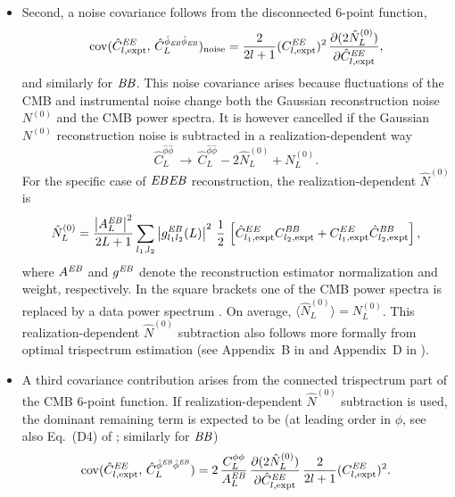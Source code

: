 \begin{itemize}
\item Second, a noise covariance follows from the disconnected 6-point function,
\begin{equation}
  \label{eq:2}
\mathrm{cov}(\hat C^{\mathit{EE}}_{l,\mathrm{expt}}, \,\hat C^{\hat\phi_{\mathit{EB}}\hat\phi_{\mathit{EB}}}_L)_\mathrm{noise}
=
\frac{2}{2l+1}(C^{\mathit{EE}}_{l,\mathrm{expt}})^2 \, \frac{\partial(2\hat N^{(0)}_L)}{\partial \hat C^{\mathit{EE}}_{l,\mathrm{expt}}},
\end{equation}
and similarly for $\mathit{BB}$.
This noise covariance arises because fluctuations of the CMB and instrumental noise change both the Gaussian reconstruction noise $N^{(0)}$ and the CMB power spectra.  It is however cancelled if the Gaussian $N^{(0)}$ reconstruction noise is subtracted in a realization-dependent way \cite{cora0812,duncan1008,Namikawa1209,marcel1308}
\begin{equation}
  \label{eq:RDN0procedure}
  \hat C^{\hat\phi\hat\phi}_L \,\rightarrow \,
\hat C^{\hat\phi\hat\phi}_L - 2 \hat N^{(0)}_L + N^{(0)}_{L}.
\end{equation}
For the specific case of $\mathit{EB}\mathit{EB}$ reconstruction, the realization-dependent $\hat N^{(0)}$ is 
\begin{equation}
  \label{eq:RDN0}
  \hat N^{(0)}_L = \frac{\left|A_L^{\mathit{EB}}\right|^2}{2L+1}\sum_{l_1,l_2} 
\left| g^{\mathit{EB}}_{l_1l_2}(L) \right|^2
\,\frac{1}{2}\,\left[\hat C^{EE}_{l_1,\mathrm{expt}} C^{\mathit{BB}}_{l_2,\mathrm{expt}}+ C^{EE}_{l_1,\mathrm{expt}} \hat C^{\mathit{BB}}_{l_2,\mathrm{expt}}\right],
\end{equation}
where $A^{\mathit{EB}}$ and $g^{\mathit{EB}}$ denote the reconstruction estimator normalization and weight, respectively. 
In the square brackets one of the CMB power spectra is replaced by a data power spectrum . On average,  $\langle \hat N^{(0)}_L \rangle = N^{(0)}_L$.  This realization-dependent $\hat N^{(0)}$ subtraction also follows more formally from optimal trispectrum estimation (see Appendix~B in \cite{marcel1308} and Appendix~D in \cite{Planck2013Lensing}).

\item A third covariance contribution  arises from the connected trispectrum part of the CMB 6-point function. If realization-dependent $\hat N^{(0)}$  subtraction is used, the dominant remaining term is expected to be (at leading order in $\phi$, see also Eq.~(D4) of \cite{marcel1308}; similarly for $\mathit{BB}$)
\begin{equation}
  \label{eq:cov_EBEB_EE}
      \mathrm{cov}(\hat C_{l,\mathrm{expt}}^{\mathit{EE}},\, \hat C_L^{\hat\phi^{\mathit{EB}}\hat\phi^{\mathit{EB}}}) = 
2\,\frac{C^{\phi\phi}_L}{A_L^{\mathit{EB}}}\,
\frac{\partial (2\hat N_L^{(0)})}{\partial \hat C^{\mathit{EE}}_{l,\mathrm{expt}}}\,
\frac{2}{2l+1}
(C^{\mathit{EE}}_{l,\mathrm{expt}})^2.
\end{equation}

\end{itemize}

